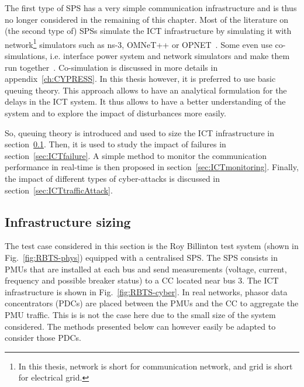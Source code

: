 The first type of SPS has a very simple communication infrastructure and is thus no longer considered in the remaining of this chapter. Most of the literature on (the second type of) SPSs simulate the ICT infrastructure by simulating it with network\footnote{In this thesis, network is short for communication network, and grid is short for electrical grid.} simulators such as ns-3, OMNeT++ or OPNET~\cite{SPS-Ciapessoni}. Some even use co-simulations, i.e. interface power system and network simulators and make them run together~\cite{SPS-MingNi, GECOtestcase}. Co-simulation is discussed in more details in appendix~\ref{ch:CYPRESS}. In this thesis however, it is preferred to use basic queuing theory. This approach allows to have an analytical formulation for the delays in the ICT system. It thus allows to have a better understanding of the system and to explore the impact of disturbances more easily.

So, queuing theory is introduced and used to size the ICT infrastructure in section~\ref{sec:ICTsizing}. Then, it is used to study the impact of failures in section~\ref{sec:ICTfailure}. A simple method to monitor the communication performance in real-time is then proposed in section~\ref{sec:ICTmonitoring}. Finally, the impact of different types of cyber-attacks is discussed in section~\ref{sec:ICTtrafficAttack}.


\subsection{Infrastructure sizing}
\label{sec:ICTsizing}

The test case considered in this section is the Roy Billinton test system (shown in Fig.~\ref{fig:RBTS-phys}) equipped with a centralised SPS. The SPS consists in PMUs that are installed at each bus and send measurements (voltage, current, frequency and possible breaker status) to a CC located near bus 3. The ICT infrastructure is shown in Fig.~\ref{fig:RBTS-cyber}. In real networks, phasor data concentrators (PDCs) are placed between the PMUs and the CC to aggregate the PMU traffic. This is is not the case here due to the small size of the system considered. The methods presented below can however easily be adapted to consider those PDCs.

